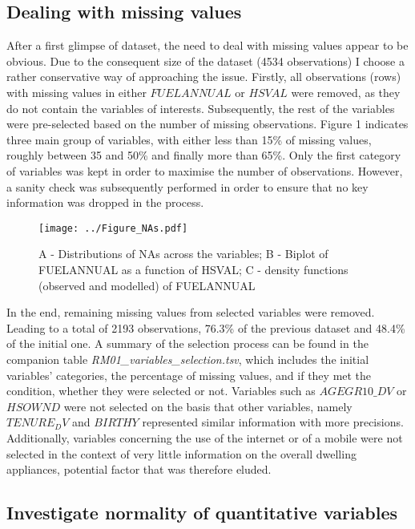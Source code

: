 \documentclass[12pt]{article}
\begin{document}
\subsection{Dealing with missing values}
After a first glimpse of dataset, the need to deal with missing values appear to be obvious. Due to the consequent size of the dataset (4534 observations) I choose a rather conservative way of approaching the issue. Firstly, all observations (rows) with missing values in either $FUELANNUAL$ or $HSVAL$ were removed, as they do not contain the variables of interests. Subsequently, the rest of the variables were pre-selected based on the number of missing observations. Figure 1 indicates three main group of variables, with either less than 15\% of missing values, roughly between 35 and 50\% and finally more than 65\%. Only the first category of variables was kept in order to maximise the number of observations. However, a sanity check was subsequently performed in order to ensure that no key information was dropped in the process.

\begin{figure}[!h]
\begin{center}
\texttt{[image: ../Figure\_NAs.pdf]}
\end{center}
\caption{\footnotesize{A - Distributions of NAs across the variables; B - Biplot of FUELANNUAL as a function of HSVAL; C - density functions (observed and modelled) of FUELANNUAL}}
\label{Figure 1}
\end{figure}

In the end, remaining missing values from selected variables were removed. Leading to a total of 2193 observations, 76.3\% of the previous dataset and 48.4\% of the initial one. A summary of the selection process can be found in the companion table \textit{RM01\_variables\_selection.tsv}, which includes the initial variables' categories, the percentage of missing values, and if they met the condition, whether they were selected or not. Variables such as $AGEGR10\_DV$ or $HSOWND$ were not selected on the basis that other variables, namely $TENURE_DV$ and $BIRTHY$ represented similar information with more precisions. Additionally, variables concerning the use of the internet or of a mobile were not selected in the context of very little information on the overall dwelling appliances, potential factor that was therefore eluded.

\subsection{Investigate normality of quantitative variables}
\end{document}

